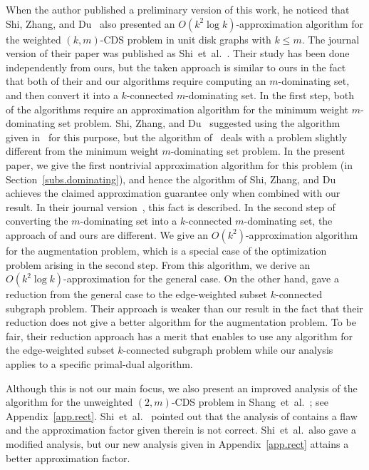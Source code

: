 \documentclass[11pt]{article}
\begin{document}
When the author published a preliminary version \cite{Fukunaga15arxiv} of this work,
he noticed that
Shi, Zhang, and Du~\cite{ShiZD15} also presented an $O(k^2 \log k)$-approximation
algorithm for the weighted $(k,m)$-CDS problem in unit disk graphs with
$k\leq m$.
The journal version of their paper was published as Shi~et~al.\ \cite{ShiZMD17}.
Their study has been done independently from ours,
but the taken approach is similar to ours
in the fact that
both of their and our algorithms require
computing an $m$-dominating set,
and then convert it into a $k$-connected $m$-dominating set.
In the first step,
both of the algorithms require
an approximation algorithm for the minimum weight $m$-dominating
set problem.
Shi, Zhang, and Du~\cite{ShiZD15}  suggested using the algorithm
given in~\cite{WillsonZWD15} for this purpose, but
the algorithm of~\cite{WillsonZWD15} 
deals with a problem slightly different from the minimum weight $m$-dominating set problem.
In the present paper, we give the first nontrivial approximation
algorithm for this problem (in Section~\ref{subs.dominating}),
and hence
the algorithm of Shi, Zhang, and Du~\cite{ShiZD15}
achieves the claimed approximation guarantee only when combined with our result.
In their journal version~\cite{ShiZMD17},
this fact is described.
In the second step of converting the $m$-dominating set into a
$k$-connected $m$-dominating set,
the approach of  \cite{ShiZD15,ShiZMD17}
and ours are different.
We give an $O(k^2)$-approximation algorithm for
 the augmentation
 problem,
 which is a special case of the optimization problem arising in the
 second step.
 From this algorithm, we derive an $O(k^2 \log k)$-approximation for the general
 case.
 On the other hand,  \cite{ShiZD15,ShiZMD17} gave a reduction from the general case
 to the edge-weighted subset $k$-connected subgraph problem.
 Their approach is weaker than our result
 in the fact that their reduction does not give a better algorithm for the
 augmentation problem.
 To be fair, their reduction approach has a merit that
  enables to use any algorithm for the edge-weighted subset $k$-connected subgraph problem
 while our analysis applies to a specific primal-dual algorithm.



Although this is not our main focus, 
we also present an improved analysis of the algorithm for the unweighted
$(2,m)$-CDS problem 
in Shang~et~al.~\cite{Shang:2007jg};
see Appendix~\ref{app.rect}.
Shi~et~al.~\cite{ShiZZW16} pointed out that the analysis of \cite{Shang:2007jg}
contains a flaw and the approximation factor given therein is not correct.
Shi~et~al.\ also gave a modified analysis, but our new analysis given in
Appendix~\ref{app.rect} attains a 
better approximation factor.
\end{document}
